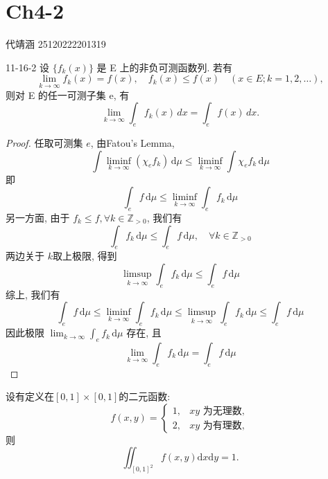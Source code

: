 \documentclass[../main.tex]{subfiles}
\begin{document}
\ifSubfilesClassLoaded{

    
    \setcounter{chapter}{3}
}{}

\chapter{ Ch4-2 }
代靖涵 25120222201319

\begin{exercise}{}{11-16-2}
    设 $\{f_k(x)\}$ 是 E 上的非负可测函数列. 若有
\[
\lim_{k \to \infty} f_k(x) = f(x), \quad f_k(x) \le f(x) \quad (x \in E; k = 1, 2, \dots),
\]
则对 E 的任一可测子集 e, 有
\[
\lim_{k \to \infty} \int_e f_k(x) \, dx = \int_e f(x) \, dx.
\]
\end{exercise}
\begin{proof}
    任取可测集 \(  e  \), 由Fatou's Lemma, \[
    \int \liminf_{k\to \infty}\left( \chi _{e}f_{k} \right) \,\mathrm{d} \mu \le \liminf_{k\to \infty}\int \chi _{e}f_{k}\,\mathrm{d} \mu 
    \] 即 \[
    \int _{e}f\,\mathrm{d} \mu \le \liminf_{k\to \infty} \int_{e}f_{k}\,\mathrm{d} \mu 
    \]另一方面, 由于 \(  f_{k}\le f  ,\forall k\in \mathbb{Z} _{> 0}\), 我们有 \[
    \int_{e}f_{k}\,\mathrm{d} \mu \le \int_{e}f\,\mathrm{d} \mu ,\quad \forall k \in \mathbb{Z} _{> 0}
    \] 两边关于 \(  k  \)取上极限, 得到 \[
    \limsup_{k\to \infty}\int_{e}f_{k}\,\mathrm{d} \mu \le \int_{e}f\,\mathrm{d} \mu 
    \] 综上, 我们有 \[
    \int_{e}f\,\mathrm{d} \mu \le \liminf_{k\to \infty}\int_{e}f_{k}\,\mathrm{d} \mu \le \limsup_{k\to \infty}\int_{e}f_{k}\,\mathrm{d} \mu \le \int_{e}f\,\mathrm{d} \mu 
    \]因此极限 \(  \lim_{k\to \infty}\int_{e}f_{k}\,\mathrm{d} \mu   \) 存在, 且 \[
    \lim_{k\to \infty}\int_{e}f_{k}\,\mathrm{d} \mu = \int_{e}f\,\mathrm{d} \mu 
    \]
\end{proof}
\begin{exercise}{}{}
    设有定义在$[0,1]\times[0,1]$的二元函数:
\[
f(x,y) = \begin{cases} 1, & xy \text{ 为无理数}, \\ 2, & xy \text{ 为有理数}, \end{cases}
\]
则
\[
\iint_{[0,1]^2} f(x,y) \mathrm{d}x\mathrm{d}y = 1.
\]
\end{exercise}
\end{document}
